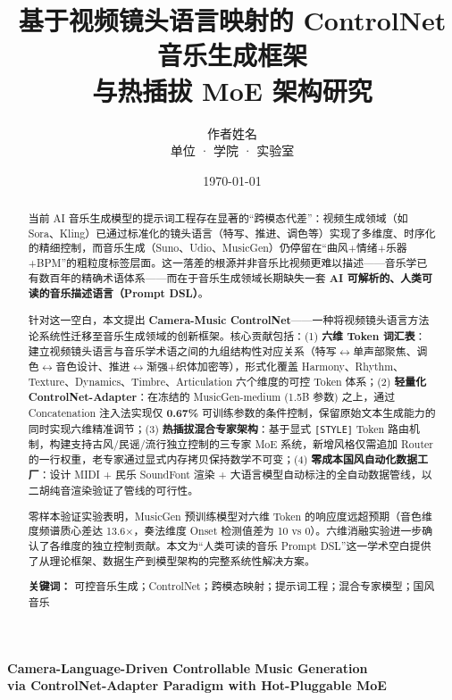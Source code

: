 \documentclass[UTF8,12pt,a4paper]{ctexart}
\title{\bfseries 基于视频镜头语言映射的 ControlNet 音乐生成框架\\与热插拔 MoE 架构研究}
\author{作者姓名\footnotemark[1] \\ {\small 单位 · 学院 · 实验室}}
\date{\today}
\begin{document}
\maketitle

\begin{center}
\large\textbf{Camera-Language-Driven Controllable Music Generation\\via ControlNet-Adapter Paradigm with Hot-Pluggable MoE}
\end{center}

\begin{abstract}
\noindent
当前 AI 音乐生成模型的提示词工程存在显著的“跨模态代差”：视频生成领域（如 Sora、Kling）已通过标准化的镜头语言（特写、推进、调色等）实现了多维度、时序化的精细控制，而音乐生成（Suno、Udio、MusicGen）仍停留在“曲风+情绪+乐器+BPM”的粗粒度标签层面。这一落差的根源并非音乐比视频更难以描述——音乐学已有数百年的精确术语体系——而在于音乐生成领域长期缺失一套 \textbf{AI 可解析的、人类可读的音乐描述语言（Prompt DSL）}。

针对这一空白，本文提出 \textbf{Camera-Music ControlNet}——一种将视频镜头语言方法论系统性迁移至音乐生成领域的创新框架。核心贡献包括：(1) \textbf{六维 Token 词汇表}：建立视频镜头语言与音乐学术语之间的九组结构性对应关系（特写$\leftrightarrow$单声部聚焦、调色$\leftrightarrow$音色设计、推进$\leftrightarrow$渐强+织体加密等），形式化覆盖 Harmony、Rhythm、Texture、Dynamics、Timbre、Articulation 六个维度的可控 Token 体系；(2) \textbf{轻量化 ControlNet-Adapter}：在冻结的 MusicGen-medium (1.5B 参数) 之上，通过 Concatenation 注入法实现仅 \textbf{0.67\%} 可训练参数的条件控制，保留原始文本生成能力的同时实现六维精准调节；(3) \textbf{热插拔混合专家架构}：基于显式 \texttt{[STYLE]} Token 路由机制，构建支持古风/民谣/流行独立控制的三专家 MoE 系统，新增风格仅需追加 Router 的一行权重，老专家通过显式内存拷贝保持数学不可变；(4) \textbf{零成本国风自动化数据工厂}：设计 MIDI + 民乐 SoundFont 渲染 + 大语言模型自动标注的全自动数据管线，以二胡纯音渲染验证了管线的可行性。

零样本验证实验表明，MusicGen 预训练模型对六维 Token 的响应度远超预期（音色维度频谱质心差达 13.6$\times$，奏法维度 Onset 检测值差为 10 vs 0）。六维消融实验进一步确认了各维度的独立控制贡献。本文为“人类可读的音乐 Prompt DSL”这一学术空白提供了从理论框架、数据生产到模型架构的完整系统性解决方案。

\vspace{6pt}
\noindent\textbf{关键词：} 可控音乐生成；ControlNet；跨模态映射；提示词工程；混合专家模型；国风音乐
\end{abstract}
\end{document}
